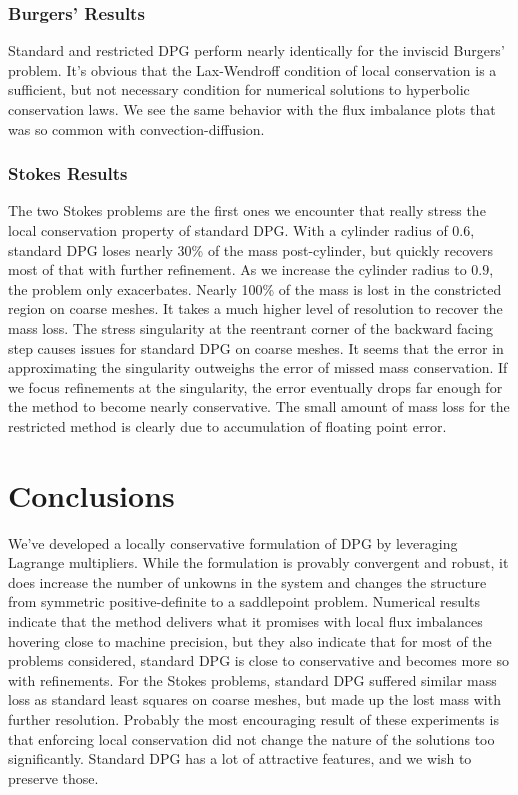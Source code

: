 \documentclass[letterpaper]{article}
\begin{document}
\subsubsection{Burgers' Results}
Standard and restricted DPG perform nearly identically for the
inviscid Burgers' problem. It's obvious that the Lax-Wendroff condition of
local conservation is a sufficient, but not necessary condition for numerical
solutions to hyperbolic conservation laws. We see the same behavior with the
flux imbalance plots that was so common with convection-diffusion.

\subsubsection{Stokes Results}
The two Stokes problems are the first ones we encounter that really stress the local
conservation property of standard DPG. With a cylinder radius of $0.6$,
standard DPG loses nearly 30\% of the mass post-cylinder, but quickly recovers
most of that with further refinement. As we increase the cylinder radius to
$0.9$, the problem only exacerbates. Nearly 100\% of the mass is lost in the
constricted region on coarse meshes. It takes a much higher level of
resolution to recover the mass loss. The stress singularity at the reentrant
corner of the backward facing step causes issues for standard DPG on coarse
meshes. It seems that the error in approximating the singularity outweighs the
error of missed mass conservation. If we focus refinements at the singularity,
the error eventually drops far enough for the method to become nearly
conservative.
The small amount of mass loss for the restricted method is clearly due to
accumulation of floating point error.

\section{Conclusions}
We've developed a locally conservative formulation of DPG by leveraging
Lagrange multipliers. While the formulation is provably convergent and robust, it does
increase the number of unkowns in the system and changes the structure from
symmetric positive-definite to a saddlepoint problem. Numerical results
indicate that the method delivers what it promises with local flux imbalances
hovering close to machine precision, but they also indicate that for most of the
problems considered, standard DPG is close to conservative and becomes more so
with refinements. For the Stokes problems, standard DPG suffered similar mass
loss as standard least squares on coarse meshes, but made up the lost mass with further
resolution.
Probably the most encouraging result of these experiments is
that enforcing local conservation did not change the nature of the solutions
too significantly. Standard DPG has a lot of attractive features, and we wish
to preserve those.
\end{document}
